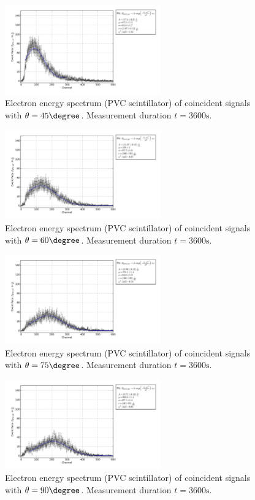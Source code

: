 \begin{figure}[h!]
  \centering
  \includegraphics[width=0.6\textwidth]{plots/pvc_45.png}
  \caption{Electron energy spectrum (PVC scintillator) of coincident signals
  with $\theta=45\degree$. Measurement duration $t=3600\mathrm{s}$.}
  \label{fig:pvc45}
\end{figure}
\begin{figure}[h!]
  \centering
  \includegraphics[width=0.6\textwidth]{plots/pvc_60.png}
  \caption{Electron energy spectrum (PVC scintillator) of coincident signals
  with $\theta=60\degree$. Measurement duration $t=3600\mathrm{s}$.}
  \label{fig:pvc60}
\end{figure}
\begin{figure}[h!]
  \centering
  \includegraphics[width=0.6\textwidth]{plots/pvc_75.png}
  \caption{Electron energy spectrum (PVC scintillator) of coincident signals
  with $\theta=75\degree$. Measurement duration $t=3600\mathrm{s}$.}
  \label{fig:pvc75}
\end{figure}
\begin{figure}[h!]
  \centering
  \includegraphics[width=0.6\textwidth]{plots/pvc_90.png}
  \caption{Electron energy spectrum (PVC scintillator) of coincident signals
  with $\theta=90\degree$. Measurement duration $t=3600\mathrm{s}$.}
  \label{fig:pvc90}
\end{figure}
